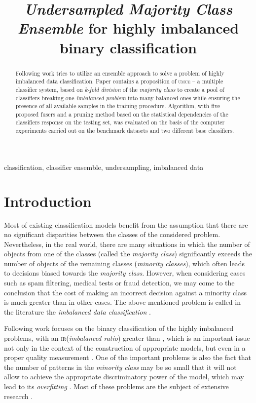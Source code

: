 \documentclass[pmlr]{jmlr}
\title
[Undersampled Majority Class Ensemble]
{
	\emph{Undersampled Majority Class Ensemble} for highly imbalanced binary classification%
}
\begin{document}
\maketitle

\begin{abstract}
Following work tries to utilize an ensemble approach to solve a problem of highly imbalanced data classification. Paper contains a proposition of \textsc{umce} -- a multiple classifier system, based on \emph{k-fold division} of the \emph{majority class} to create a pool of classifiers breaking one \emph{imbalanced problem} into many balanced ones while ensuring the presence of all available samples in the training procedure. Algorithm, with five proposed fusers and a pruning method based on the statistical dependencies of the classifiers response on the testing set, was evaluated on the basis of the computer experiments carried out on the benchmark datasets and two different base classifiers.
\end{abstract}
\begin{keywords}
classification, classifier ensemble, undersampling, imbalanced data
\end{keywords}

\section{Introduction}
\label{sec:intro}

Most of existing classification models benefit from the assumption that there are no significant disparities between the classes of the considered problem. Nevertheless, in the real world, there are many situations in which the number of objects from one of the classes (called the \emph{majority class}) significantly exceeds the number of objects of the remaining classes (\emph{minority classes}), which often leads to decisions biased towards the \emph{majority class}. However, when considering cases such as spam filtering, medical tests or fraud detection, we may come to the conclusion that the cost of making an incorrect decision against a minority class is much greater than in other cases. The above-mentioned problem is called in the literature the \emph{imbalanced data classification} \citep{Wang:2017,Sun:2009}.

Following work focuses on the binary classification of the highly imbalanced problems, with an \textsc{ir}(\emph{imbalanced ratio}) greater than , which is an important issue not only in the context of the construction of appropriate models, but even in a proper quality measurement \citep{Elazmeh:2006}. One of the important problems is also the fact that the number of patterns in the \emph{minority class} may be so small that it will not allow to achieve the appropriate discriminatory power of the model, which may lead to its \emph{overfitting} \citep{Chen:2008}. Most of these problems are the subject of extensive research \citep{Bunkhumpornpat:2009,Chawla:2002}.
\end{document}
